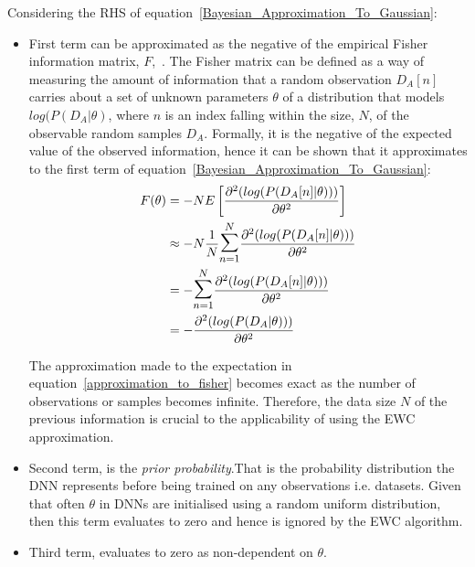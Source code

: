 \noindent Considering the RHS of equation~\ref{Bayesian_Approximation_To_Gaussian}:
\begin{itemize}
    \item First term can be approximated as the negative of the empirical Fisher information matrix, $F$,~\cite{Kay1993,Ly2017,Martens2020}. 
    The Fisher matrix can be defined as a way of measuring the amount of information that a random observation $D_A[n]$ carries about a set of unknown parameters $\theta$ of a distribution that models $log(P(D_A|\theta)$, where $n$ is an index falling within the size, $N$, of the observable random samples $D_A$. 
    Formally, it is the negative of the expected value of the observed information, hence it can be shown that it approximates to the first term of equation~\ref{Bayesian_Approximation_To_Gaussian}: 
%
    \begin{equation} \label{approximation_to_fisher}
    \begin{split}
    F(\theta) &= -N E\left[\frac{\partial^2(log(P(D_A[n]|\theta)))}{\partial\theta^2}\right]
    \\
    & \approx -N \frac{1}{N}\mathlarger{\mathlarger{\sum}}_{n=1}^{N} \frac{\partial^2(log(P(D_A[n]|\theta)))}{\partial\theta^2}
    \\
    &
    = -\mathlarger{\mathlarger{\sum}}_{n=1}^{N} \frac{\partial^2(log(P(D_A[n]|\theta)))}{\partial\theta^2} 
    \\
    &
    = -\frac{\partial^2(log(P(D_A|\theta)))}{\partial\theta^2} 
    \end{split}
    \end{equation}
    
    \noindent The approximation made to the expectation in equation~\ref{approximation_to_fisher} becomes exact as the number of observations or samples becomes infinite.
    Therefore, the data size $N$ of the previous information is crucial to the applicability of using the EWC approximation.
 
%
    \item Second term, is the \textit{prior probability}.That is the probability distribution the DNN represents before being trained on any observations i.e. datasets.
    Given that often $\theta$ in DNNs are initialised using a random uniform distribution, then this term evaluates to zero and hence is ignored by the EWC algorithm.

    
    \item Third term, evaluates to zero as non-dependent on $\theta$.
    
\end{itemize}


